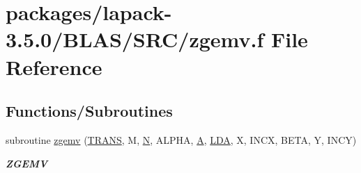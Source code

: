 \hypertarget{lapack-3_85_80_2BLAS_2SRC_2zgemv_8f}{}\section{packages/lapack-\/3.5.0/\+B\+L\+A\+S/\+S\+R\+C/zgemv.f File Reference}
\label{lapack-3_85_80_2BLAS_2SRC_2zgemv_8f}
\subsection*{Functions/\+Subroutines}
\begin{DoxyCompactItemize}
\item 
subroutine \hyperlink{group__complex16__blas__level2_gafaeb2abd9fffa7442b938dc384aeaf47}{zgemv} (\hyperlink{superlu__enum__consts_8h_a0c4e17b2d5cea33f9991ccc6a6678d62a1f61e3015bfe0f0c2c3fda4c5a0cdf58}{T\+R\+A\+N\+S}, M, \hyperlink{polmisc_8c_a0240ac851181b84ac374872dc5434ee4}{N}, A\+L\+P\+H\+A, \hyperlink{classA}{A}, \hyperlink{example__user_8c_ae946da542ce0db94dced19b2ecefd1aa}{L\+D\+A}, X, I\+N\+C\+X, B\+E\+T\+A, Y, I\+N\+C\+Y)
\begin{DoxyCompactList}\small\item\em {\bfseries Z\+G\+E\+M\+V} \end{DoxyCompactList}\end{DoxyCompactItemize}
